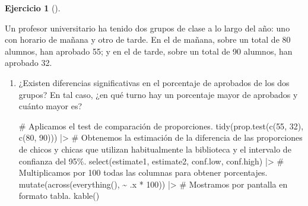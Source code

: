 \documentclass[
  a4paper,
]{scrreport}
\newenvironment{Shaded}{\begin{snugshade}}{\end{snugshade}}
\newcommand{\CommentTok}[1]{\textcolor[rgb]{0.37,0.37,0.37}{#1}}
\newcommand{\DecValTok}[1]{\textcolor[rgb]{0.68,0.00,0.00}{#1}}
\newcommand{\FunctionTok}[1]{\textcolor[rgb]{0.28,0.35,0.67}{#1}}
\newcommand{\NormalTok}[1]{\textcolor[rgb]{0.00,0.23,0.31}{#1}}
\newcommand{\SpecialCharTok}[1]{\textcolor[rgb]{0.37,0.37,0.37}{#1}}
\theoremstyle{definition}
\newtheorem{exercise}{Ejercicio}[chapter]
\theoremstyle{remark}
\begin{document}
\begin{exercise}[]\protect\hypertarget{exr-intervalo-comparacion-proporciones-aprobados}{}\label{exr-intervalo-comparacion-proporciones-aprobados}

Un profesor universitario ha tenido dos grupos de clase a lo largo del
año: uno con horario de mañana y otro de tarde. En el de mañana, sobre
un total de 80 alumnos, han aprobado 55; y en el de tarde, sobre un
total de 90 alumnos, han aprobado 32.

\begin{enumerate}
\def\labelenumi{\alph{enumi}.}
\item
  ¿Existen diferencias significativas en el porcentaje de aprobados de
  los dos grupos? En tal caso, ¿en qué turno hay un porcentaje mayor de
  aprobados y cuánto mayor es?

  \begin{tcolorbox}[enhanced jigsaw, breakable, toptitle=1mm, colbacktitle=quarto-callout-tip-color!10!white, rightrule=.15mm, opacityback=0, opacitybacktitle=0.6, titlerule=0mm, coltitle=black, colframe=quarto-callout-tip-color-frame, colback=white, bottomtitle=1mm, leftrule=.75mm, toprule=.15mm, title=\textcolor{quarto-callout-tip-color}{\faLightbulb}\hspace{0.5em}{Solución}, arc=.35mm, bottomrule=.15mm, left=2mm]

\begin{Shaded}
\begin{Highlighting}[]
\CommentTok{\# Aplicamos el test de comparación de proporciones.}
\FunctionTok{tidy}\NormalTok{(}\FunctionTok{prop.test}\NormalTok{(}\FunctionTok{c}\NormalTok{(}\DecValTok{55}\NormalTok{, }\DecValTok{32}\NormalTok{), }\FunctionTok{c}\NormalTok{(}\DecValTok{80}\NormalTok{, }\DecValTok{90}\NormalTok{))) }\SpecialCharTok{|\textgreater{}} 
\CommentTok{\# Obtenemos la estimación de la diferencia de las proporciones de chicos y chicas que utilizan habitualmente la biblioteca y el intervalo de confianza del 95\%.}
    \FunctionTok{select}\NormalTok{(estimate1, estimate2, conf.low, conf.high) }\SpecialCharTok{|\textgreater{}} 
    \CommentTok{\# Multiplicamos por 100 todas las columnas para obtener porcentajes.}
    \FunctionTok{mutate}\NormalTok{(}\FunctionTok{across}\NormalTok{(}\FunctionTok{everything}\NormalTok{(), }\SpecialCharTok{\textasciitilde{}}\NormalTok{ .x }\SpecialCharTok{*} \DecValTok{100}\NormalTok{)) }\SpecialCharTok{|\textgreater{}} 
    \CommentTok{\# Mostramos por pantalla en formato tabla.}
    \FunctionTok{kable}\NormalTok{()}
\end{Highlighting}
\end{Shaded}


\end{tcolorbox}
\end{enumerate}
\end{exercise}
\end{document}
